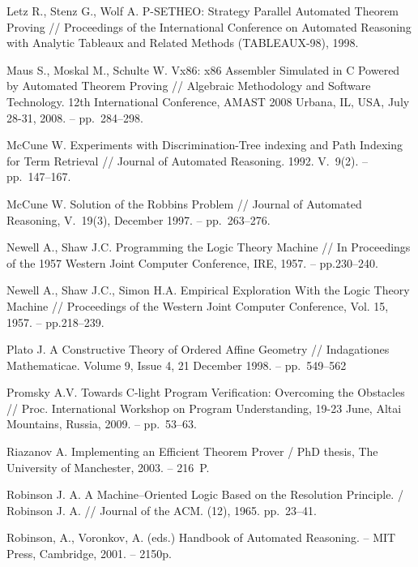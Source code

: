\begin{thebibliography}{99}
  Letz R., Stenz G., Wolf A. P-SETHEO: Strategy Parallel Automated Theorem Proving // Proceedings of the International Conference on Automated Reasoning with Analytic Tableaux and Related Methods (TABLEAUX-98), 1998.

 Maus S., Moskal M., Schulte W. Vx86: x86 Assembler Simulated in C Powered by Automated Theorem Proving // Algebraic Methodology and Software Technology. 12th International Conference, AMAST 2008 Urbana, IL, USA, July 28-31, 2008.  -- pp.~284--298.

 McCune W. Experiments with Discrimination-Tree indexing and Path Indexing for Term Retrieval // Journal of Automated Reasoning. 1992. V.~9(2). -- pp.~147--167.

 McCune W. Solution of the Robbins Problem // Journal of Automated Reasoning, V.~19(3), December 1997. -- pp.~263--276.


 Newell A., Shaw J.C. Programming the Logic Theory Machine // In Proceedings of the 1957 Western Joint Computer Conference, IRE, 1957. -- pp.230--240.

 Newell A., Shaw J.C., Simon H.A. Empirical Exploration With the Logic Theory Machine // Proceedings of the Western Joint Computer Conference, Vol. 15, 1957. -- pp.218--239.

 Plato J. A Constructive Theory of Ordered Affine Geometry // Indagationes Mathematicae. Volume 9, Issue 4, 21 December 1998. -- pp.~549--562

 Promsky A.V. Towards C-light Program Verification: Overcoming the Obstacles // Proc. International Workshop on Program Understanding, 19-23 June, Altai Mountains, Russia, 2009. -- pp.~53--63.

 Riazanov A. Implementing an Efficient Theorem Prover /  PhD thesis, The University of Manchester, 2003. -- 216~P.

 Robinson J. A. A Machine--Oriented Logic Based on the Resolution Principle. / Robinson J. A. //  Journal of the ACM. (12), 1965. pp.~23--41.

 Robinson, A., Voronkov, A. (eds.) Handbook of Automated Reasoning. -- MIT Press, Cambridge, 2001. -- 2150p.


\end{thebibliography}
